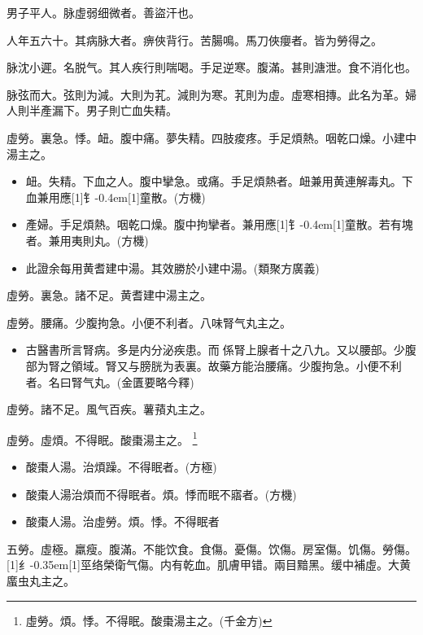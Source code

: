 \documentclass[11pt,oneside,b5paper]{ctexbook}
\begin{document}
\begin{flushleft}
男子平人。脉虛弱细微者。善盜汗也。

人年五六十。其病脉大者。痹俠背行。苦腸鳴。馬刀俠癭者。皆为勞得之。

脉沈小遲。名脱气。其人疾行則喘喝。手足逆寒。腹滿。甚則溏泄。食不消化也。

脉弦而大。弦則为減。大則为芤。減則为寒。芤則为虛。虛寒相摶。此名为革。婦人則半產漏下。男子則亡血失精。

虛勞。裏急。悸。衄。腹中痛。夢失精。四肢痠疼。手足煩熱。咽乾口燥。小建中湯主之。

\begin{itemize}
\item 衄。失精。下血之人。腹中攣急。或痛。手足煩熱者。衄兼用黄連解毒丸。下血兼用應{\hbox{\scalebox{0.7}[1]{钅}\kern-0.4em\scalebox{0.7}[1]{童}}}散。(方機)
\item 產婦。手足煩熱。咽乾口燥。腹中拘攣者。兼用應{\hbox{\scalebox{0.7}[1]{钅}\kern-0.4em\scalebox{0.7}[1]{童}}}散。若有塊者。兼用夷則丸。(方機)
\item 此證余每用黄耆建中湯。其效勝於小建中湯。(類聚方廣義)
\end{itemize}

虛勞。裏急。諸不足。黄耆建中湯主之。

虛勞。腰痛。少腹拘急。小便不利者。八味腎气丸主之。

\begin{itemize}
\item 古醫書所言腎病。多是内分泌疾患。而{𬮦}係腎上腺者十之八九。又以腰部。少腹部为腎之領域。腎又与膀胱为表裏。故藥方能治腰痛。少腹拘急。小便不利者。名曰腎气丸。(金匱要略今釋)
\end{itemize}

虛勞。諸不足。風气百疾。薯蕷丸主之。

虛勞。虛煩。不得眠。酸棗湯主之。
\footnote{虛勞。煩。悸。不得眠。酸棗湯主之。(千金方)}

\begin{itemize}
\item 酸棗人湯。治煩躁。不得眠者。(方極)
\item 酸棗人湯治煩而不得眠者。煩。悸而眠不寤者。(方機)
\item 酸棗人湯。治虛勞。煩。悸。不得眠者
\end{itemize}

五勞。虛極。羸瘦。腹滿。不能饮食。食傷。憂傷。饮傷。房室傷。饥傷。勞傷。{\hbox{\scalebox{0.68}[1]{纟}\kern-0.35em\scalebox{0.64}[1]{巠}}}络榮衛气傷。内有乾血。肌膚甲错。兩目黯黑。缓中補虛。大黄䗪虫丸主之。


\end{flushleft}
\end{document}
